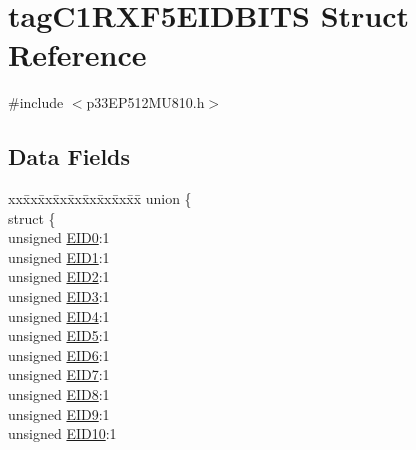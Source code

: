 \hypertarget{structtag_c1_r_x_f5_e_i_d_b_i_t_s}{}\section{tag\+C1\+R\+X\+F5\+E\+I\+D\+B\+I\+TS Struct Reference}
\label{structtag_c1_r_x_f5_e_i_d_b_i_t_s}


{\ttfamily \#include $<$p33\+E\+P512\+M\+U810.\+h$>$}

\subsection*{Data Fields}
\begin{DoxyCompactItemize}
\item 
\begin{tabbing}
xx\=xx\=xx\=xx\=xx\=xx\=xx\=xx\=xx\=\kill
union \{\\
\>struct \{\\
\>\>unsigned \hyperlink{structtag_c1_r_x_f5_e_i_d_b_i_t_s_a9da8b7b30247e4f9cd8cc056549aa9fd}{EID0}:1\\
\>\>unsigned \hyperlink{structtag_c1_r_x_f5_e_i_d_b_i_t_s_afd6c139491d147c1262f3d051c6691e9}{EID1}:1\\
\>\>unsigned \hyperlink{structtag_c1_r_x_f5_e_i_d_b_i_t_s_a36ec62d8d3c5acd5d15e6691dc099a94}{EID2}:1\\
\>\>unsigned \hyperlink{structtag_c1_r_x_f5_e_i_d_b_i_t_s_ab895f7d0ac289a0383b607cbc62eebe2}{EID3}:1\\
\>\>unsigned \hyperlink{structtag_c1_r_x_f5_e_i_d_b_i_t_s_a136d5a709d6618d40acceccb43036656}{EID4}:1\\
\>\>unsigned \hyperlink{structtag_c1_r_x_f5_e_i_d_b_i_t_s_a8dffb2d86a6c184df505ae7c71a58710}{EID5}:1\\
\>\>unsigned \hyperlink{structtag_c1_r_x_f5_e_i_d_b_i_t_s_af8a8574102515d8f1a4b7fd1685d0532}{EID6}:1\\
\>\>unsigned \hyperlink{structtag_c1_r_x_f5_e_i_d_b_i_t_s_a84c3262e67f8d5fd387ac10bde6fa9b1}{EID7}:1\\
\>\>unsigned \hyperlink{structtag_c1_r_x_f5_e_i_d_b_i_t_s_acca25e0b7d86eb499d01f85222baea87}{EID8}:1\\
\>\>unsigned \hyperlink{structtag_c1_r_x_f5_e_i_d_b_i_t_s_ac6748f73d4ada8538b06548be4f396c2}{EID9}:1\\
\>\>unsigned \hyperlink{structtag_c1_r_x_f5_e_i_d_b_i_t_s_a9cea8e77ecbb72bd3b08102412793725}{EID10}:1\\

\end{tabbing}
\end{DoxyCompactItemize}
